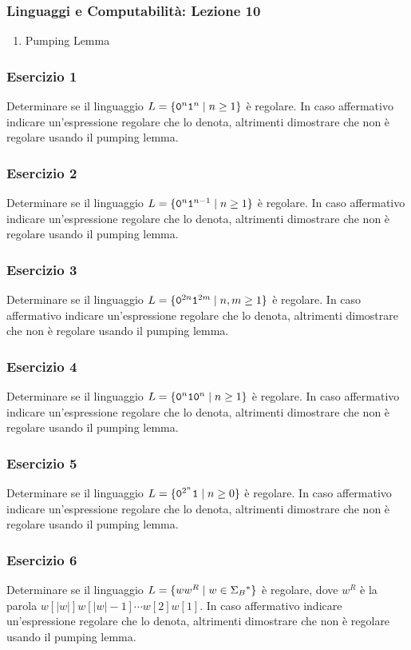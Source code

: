 




\begin{frame}[fragile]
	\frametitle{Linguaggi e Computabilità: Lezione 10}
\begin{enumerate}
\item
Pumping Lemma
\end{enumerate}
\end{frame}

\begin{frame}
\frametitle{Esercizio 1}
Determinare se il linguaggio $L = \{ \mathtt{0}^{n}  \mathtt{1}^{n} \; \vert \; n \ge 1 \}$ è regolare.
In caso affermativo indicare un'espressione regolare che lo denota, altrimenti dimostrare che non è regolare usando il pumping lemma.
\end{frame}

\begin{frame}
\frametitle{Esercizio 2}
Determinare se il linguaggio $L = \{ \mathtt{0}^{n}  \mathtt{1}^{n-1} \; \vert \; n \ge 1 \}$ è regolare.
In caso affermativo indicare un'espressione regolare che lo denota, altrimenti dimostrare che non è regolare usando il pumping lemma.
\end{frame}

\begin{frame}
\frametitle{Esercizio 3}
Determinare se il linguaggio $L = \{ \mathtt{0}^{2n}  \mathtt{1}^{2m} \; \vert \; n,m \ge 1 \}$ è regolare.
In caso affermativo indicare un'espressione regolare che lo denota, altrimenti dimostrare che non è regolare usando il pumping lemma.
\end{frame}


\begin{frame}
\frametitle{Esercizio 4}
Determinare se il linguaggio $L = \{ \mathtt{0}^{n}  \mathtt{1} \mathtt{0}^{n} \; \vert \; n \ge 1 \}$ è regolare.
In caso affermativo indicare un'espressione regolare che lo denota, altrimenti dimostrare che non è regolare usando il pumping lemma.
\end{frame}


\begin{frame}
\frametitle{Esercizio 5}
Determinare se il linguaggio $L = \{ \mathtt{0}^{2^{n}}  \mathtt{1}  \; \vert \; n \ge 0 \}$ è regolare.
In caso affermativo indicare un'espressione regolare che lo denota, altrimenti dimostrare che non è regolare usando il pumping lemma.
\end{frame}

\begin{frame}
\frametitle{Esercizio 6}
Determinare se il linguaggio $L = \{ ww^{R} \; \vert \; w\in \Sigma_{B}{}^{\ast} \}$ è regolare,
dove $w^{R}$ è la parola $w[|w|]w[|w|-1]\cdots w[2]w[1]$.
In caso affermativo indicare un'espressione regolare che lo denota, altrimenti dimostrare che non è regolare usando il pumping lemma.
\end{frame}

